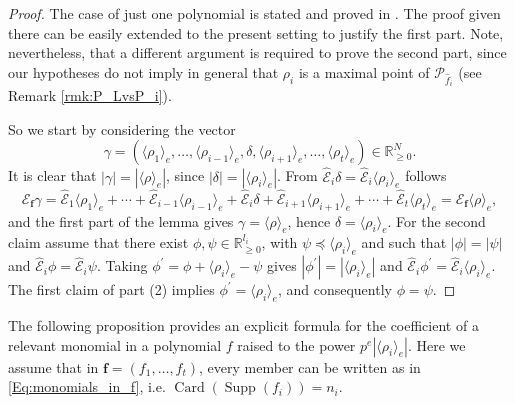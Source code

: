 \documentclass[12pt]{amsart}
\theoremstyle{definition}
\numberwithin{equation}{subsection}
\newcommand{\RR}{\mathbb{R}}
\newcommand{\SP}{\mathcal{P}}
\newcommand{\Bf}{\boldsymbol{f}}
\newcommand{\Card}{\operatorname{Card}}
\newcommand{\E}{\mathcal{E}}
\newcommand{\tE}{\operatorname{\widehat{\E}}}
\newcommand{\Supp}{\operatorname{Supp}}
\renewcommand{\!}[1]{{\color{red}\text{\Huge$\star$ }#1}}
\begin{document}
\begin{proof}
 The case of just one polynomial is stated and proved in  \cite[Lemma 24]{HDpolynomials}. The proof given there can be easily extended to the present setting to justify the first part. Note, nevertheless, that a different argument is required to prove the second part, since our hypotheses do not imply in general that $\rho_i$ is a maximal point of $\SP_{\hat{f}_i}$ (see Remark \ref{rmk:P_LvsP_i}). 
 
 So we  start by considering the vector
 \[\gamma=(\langle \rho_1 \rangle_e, \ldots, \langle \rho_{i-1}\rangle_e,\delta,\langle \rho_{i+1} \rangle_e,\ldots,\langle \rho_{t} \rangle_e ) \in \RR_{\geq 0}^N.
 \]
It is clear that $|\gamma|=|\langle \rho \rangle_e|$, since $|\delta|=|\langle \rho_i \rangle_e|$. From $\tE_i \delta = \tE_i  \langle \rho_i \rangle_e$ follows
 \[\E_{\Bf} \gamma=\tE_1 \langle \rho_1 \rangle_e + \cdots + \tE_{i-1}\langle \rho_{i-1}\rangle_e + \tE_i \delta + \tE_{i+1} \langle \rho_{i+1} \rangle_e + \cdots + \tE_t \langle \rho_{t} \rangle_e =\E_{\Bf} \langle \rho \rangle_e,
 \]
and the first part of the lemma gives $\gamma= \langle \rho \rangle_e$, hence $\delta=\langle \rho_i \rangle_e$. For the second claim assume that there exist  $\phi, \psi \in \RR_{\geq 0}^{l_i}$, with $\psi \preceq \langle \rho_i \rangle_e$ and such that $|\phi|=|\psi|$ and $\tE_i \phi = \tE_i \psi$. Taking  $\phi^\prime=\phi+\langle \rho_i \rangle_e-\psi$ gives  $|\phi^\prime|= |\langle \rho_i \rangle_e|$ and $\tE_i \phi^\prime= \tE_i \langle \rho_i \rangle_e$. The first claim of part (2) implies $\phi^\prime=\langle \rho_i \rangle_e$, and consequently $\phi=\psi$.
\end{proof}

The following proposition provides an explicit formula for the coefficient of a relevant monomial in a polynomial $f$ raised to the power $p^{e}|\langle \rho_i \rangle_e|$. Here we assume that in $\Bf=(f_1, \ldots, f_t)$, every member can be written as in \eqref{Eq:monomials_in_f}, i.e. $\Card(\Supp(f_i))=n_i$.
\end{document}
